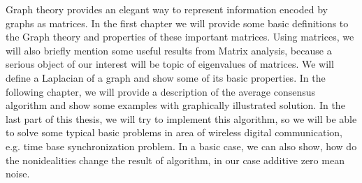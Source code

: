 Graph theory provides an elegant way to represent information encoded by graphs as matrices. In the first chapter we will provide some basic definitions to the Graph theory and properties of these important matrices. Using matrices, we will also briefly mention some  useful results from Matrix analysis, because a serious object of our interest will be topic of eigenvalues of matrices. We will define a Laplacian of a graph and show some of its basic properties. In the following chapter, we will provide a description of the average consensus algorithm and show some examples with graphically illustrated solution. In the last part of this thesis, we will try to implement this algorithm, so we will be able to solve some typical basic problems in area of wireless digital communication, e.g. time base synchronization problem. In a basic case, we can also show, how do the nonidealities change the result of algorithm, in our case additive zero mean noise.


